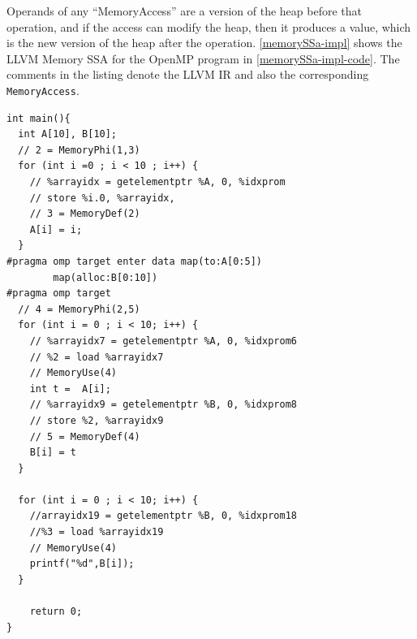 Operands of any ``MemoryAccess'' are a version
of the heap before that operation, and if the access can modify 
the heap, then it produces a value, which is the new version of 
the heap after the operation. 
\autoref{memorySSa-impl} shows the LLVM Memory SSA for the OpenMP program
in 
\autoref{memorySSa-impl-code}. 
The comments in the listing denote the LLVM IR and also 
the corresponding \texttt{MemoryAccess}. 
\begin{minipage}{.6\textwidth}
\begin{lstlisting}[style=customc, basicstyle=\scriptsize, caption={OpenMP program, 
for \autoref{memorySSa-impl}}, label=memorySSa-impl-code]
int main(){
  int A[10], B[10];   
  // 2 = MemoryPhi(1,3)
  for (int i =0 ; i < 10 ; i++) {    
    // %arrayidx = getelementptr %A, 0, %idxprom
    // store %i.0, %arrayidx,
    // 3 = MemoryDef(2)
    A[i] = i;
  }
#pragma omp target enter data map(to:A[0:5]) 
        map(alloc:B[0:10])                                          
#pragma omp target
  // 4 = MemoryPhi(2,5)
  for (int i = 0 ; i < 10; i++) {
    // %arrayidx7 = getelementptr %A, 0, %idxprom6
    // %2 = load %arrayidx7
    // MemoryUse(4)
    int t =  A[i];    
    // %arrayidx9 = getelementptr %B, 0, %idxprom8
    // store %2, %arrayidx9 
    // 5 = MemoryDef(4)
    B[i] = t
  }

  for (int i = 0 ; i < 10; i++) {    
    //arrayidx19 = getelementptr %B, 0, %idxprom18       
    //%3 = load %arrayidx19
    // MemoryUse(4)
    printf("%d",B[i]);
  }

    return 0;
}
\end{lstlisting}
\end{minipage}

